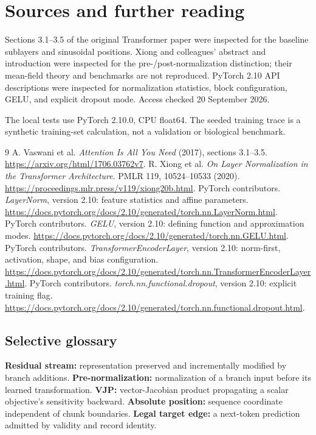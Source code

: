 \chapter*{Sources and further reading}
Sections 3.1--3.5 of the original Transformer paper were inspected for the baseline sublayers and sinusoidal positions. Xiong and colleagues' abstract and introduction were inspected for the pre-/post-normalization distinction; their mean-field theory and benchmarks are not reproduced. PyTorch 2.10 API descriptions were inspected for normalization statistics, block configuration, GELU, and explicit dropout mode. Access checked 20 September 2026.

The local tests use PyTorch 2.10.0, CPU float64. The seeded training trace is a synthetic training-set calculation, not a validation or biological benchmark.
\begingroup\let\chapter\section
\begin{thebibliography}{9}
 A. Vaswani et al. \emph{Attention Is All You Need} (2017), sections 3.1--3.5. \url{https://arxiv.org/html/1706.03762v7}.
 R. Xiong et al. \emph{On Layer Normalization in the Transformer Architecture}. PMLR 119, 10524--10533 (2020). \url{https://proceedings.mlr.press/v119/xiong20b.html}.
 PyTorch contributors. \emph{LayerNorm}, version 2.10: feature statistics and affine parameters. \url{https://docs.pytorch.org/docs/2.10/generated/torch.nn.LayerNorm.html}.
 PyTorch contributors. \emph{GELU}, version 2.10: defining function and approximation modes. \url{https://docs.pytorch.org/docs/2.10/generated/torch.nn.GELU.html}.
 PyTorch contributors. \emph{TransformerEncoderLayer}, version 2.10: norm-first, activation, shape, and bias configuration. \url{https://docs.pytorch.org/docs/2.10/generated/torch.nn.TransformerEncoderLayer.html}.
 PyTorch contributors. \emph{torch.nn.functional.dropout}, version 2.10: explicit training flag. \url{https://docs.pytorch.org/docs/2.10/generated/torch.nn.functional.dropout.html}.
\end{thebibliography}
\endgroup
\medskip
\section*{Selective glossary}
\textbf{Residual stream:} representation preserved and incrementally modified by branch additions.
\textbf{Pre-normalization:} normalization of a branch input before its learned transformation.
\textbf{VJP:} vector-Jacobian product propagating a scalar objective's sensitivity backward.
\textbf{Absolute position:} sequence coordinate independent of chunk boundaries.
\textbf{Legal target edge:} a next-token prediction admitted by validity and record identity.
